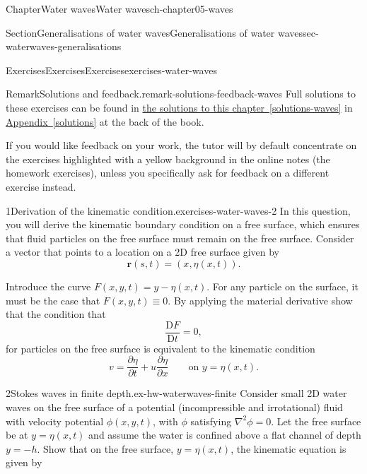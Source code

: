 \documentclass[oneside,10pt,]{book}
\newcommand{\xreffont}{\relax}
\newcommand{\ptxlistdisc}{\raisebox{0.3ex}{\textbullet}}
\numberwithin{equation}{section}
\newcommand{\DD}[2]{\frac{\mathrm{D}#1}{\mathrm{D}#2}}
\newcommand{\pd}[2]{\frac{\partial#1}{\partial#2}}
\newcommand{\br}{\boldsymbol{r}}
\begin{document}
\begin{chapterptx}{Chapter}{Water waves}{}{Water waves}{}{}{ch-chapter05-waves}
\begin{sectionptx}{Section}{Generalisations of water waves}{}{Generalisations of water waves}{}{}{sec-waterwaves-generalisations}
\begin{itemize}[label=\ptxlistdisc]
%
\end{itemize}
%
\end{sectionptx}
%
%
\typeout{************************************************}
\typeout{************************************************}
%
\begin{exercises-section}{Exercises}{Exercises}{}{Exercises}{}{}{exercises-water-waves}
\begin{introduction}{}%
\begin{remark}{Remark}{Solutions and feedback.}{remark-solutions-feedback-waves}%
Full solutions to these exercises can be found in \hyperref[solutions-waves]{the solutions to this chapter~{\xreffont\ref{solutions-waves}}} in \hyperref[solutions]{Appendix~{\xreffont\ref{solutions}}} at the back of the book.%
\par
If you would like feedback on your work, the tutor will by default concentrate on the exercises highlighted with a yellow background in the online notes (the homework exercises), unless you specifically ask for feedback on a different exercise instead.%
\end{remark}
\end{introduction}%
\begin{divisionexercise}{1}{Derivation of the kinematic condition.}{}{exercises-water-waves-2}%
In this question, you will derive the kinematic boundary condition on a free surface, which ensures that fluid particles on the free surface must remain on the free surface. Consider a vector that points to a location on a 2D free surface given by%
\begin{equation*}
\br(s, t) = (x, \eta(x, t)).
\end{equation*}
%
\par
Introduce the curve \(F(x, y, t) = y - \eta(x, t)\). For any particle on the surface, it must be the case that \(F(x, y, t) \equiv 0\). By applying the material derivative show that the condition that%
\begin{equation*}
\DD{F}{t} = 0,
\end{equation*}
for particles on the free surface is equivalent to the kinematic condition%
\begin{equation*}
v = \pd{\eta}{t} + u\pd{\eta}{x} \qquad \text{on $y = \eta(x, t)$}.
\end{equation*}
%
\end{divisionexercise}%
\begin{divisionexercise}{2}{Stokes waves in finite depth.}{}{ex-hw-waterwaves-finite}%
Consider small 2D water waves on the free surface of a potential (incompressible and irrotational) fluid with velocity potential \(\phi(x, y,t)\), with \(\phi\) satisfying \(\nabla^2 \phi = 0\). Let the free surface be at \(y = \eta(x, t)\) and assume the water is confined above a flat channel of depth \(y = -h\). Show that on the free surface, \(y = \eta(x, t)\), the kinematic equation is given by%

\end{divisionexercise}
\end{exercises-section}
\end{chapterptx}
\end{document}
